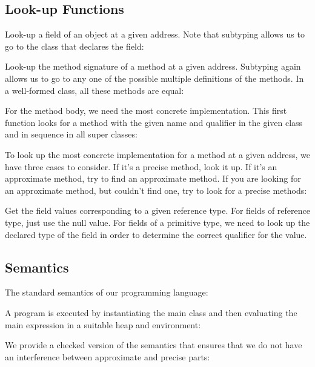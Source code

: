 \subsection{Look-up Functions}

Look-up a field of an object at a given address.
Note that subtyping allows us to go to the class that declares the
field:

\ottdefnrftype


Look-up the method signature of a method at a given address.
Subtyping again allows us to go to any one of the possible multiple
definitions of the methods. In a well-formed class, all these methods
are equal:

\ottdefnrmsign


For the method body, we need the most concrete implementation.
This first function looks for a method with the given name and
qualifier in the given class and in sequence in all super classes:

\ottdefnsmbodyc


To look up the most concrete implementation for a method at a given
address, we have three cases to consider.
If it's a precise method, look it up.
If it's an approximate method, try to find an approximate method.
If you are looking for an approximate method, but couldn't find one,
try to look for a precise methods:

\ottdefnrmbody


Get the field values corresponding to a given reference type.
For fields of reference type, just use the null value.
For fields of a primitive type, we need to look up the declared type
of the field in order to determine the correct qualifier for the
value.

\ottdefnfvsinit


\subsection{Semantics}

The standard semantics of our programming language:

\ottdefnsemantics


A program is executed by instantiating the main class and then
evaluating the main expression in a suitable heap and environment:

\ottdefnsemanticsXXprg


We provide a checked version of the semantics that ensures that we do
not have an interference between approximate and precise parts:

